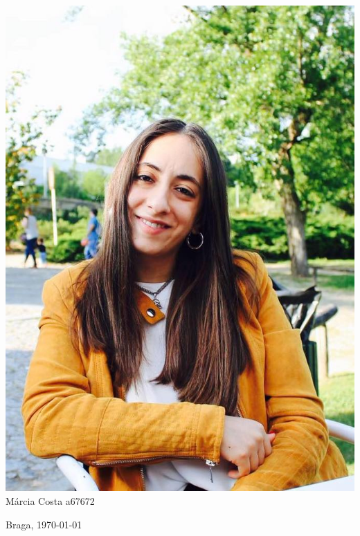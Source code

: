 \begin{titlepage}
\begin{center}
\begin{minipage}[b]{.2\textwidth}
	\includegraphics[scale=0.2001]{marcia}
	\small{Márcia Costa a67672}
\end{minipage}




\vspace{3ex}


\vfill

\large Braga, {\large \today}

\end{center}
\end{titlepage}
